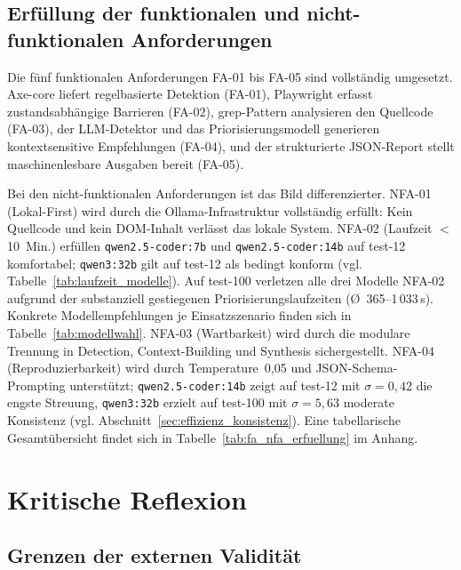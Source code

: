 \subsection{Erfüllung der funktionalen und nicht-funktionalen Anforderungen}
\label{sec:fazit_anforderungen}

Die fünf funktionalen Anforderungen \ac{FA}-01 bis \ac{FA}-05 sind vollständig umgesetzt. Axe-core liefert regelbasierte Detektion (\ac{FA}-01), Playwright erfasst zustandsabhängige Barrieren (\ac{FA}-02), grep-Pattern analysieren den Quellcode (\ac{FA}-03), der \ac{LLM}-Detektor und das Priorisierungsmodell generieren kontextsensitive Empfehlungen (\ac{FA}-04), und der strukturierte \acs{JSON}-Report stellt maschinenlesbare Ausgaben bereit (\ac{FA}-05).

Bei den nicht-funktionalen Anforderungen ist das Bild differenzierter. \ac{NFA}-01 (Lokal-First) wird durch die Ollama-Infrastruktur vollständig erfüllt: Kein Quellcode und kein \ac{DOM}-Inhalt verlässt das lokale System. \ac{NFA}-02 (Laufzeit $<$ 10~Min.) erfüllen \texttt{qwen2.5-coder:7b} und \texttt{qwen2.5-coder:14b} auf test-12 komfortabel; \texttt{qwen3:32b} gilt auf test-12 als bedingt konform (vgl. Tabelle~\ref{tab:laufzeit_modelle}). Auf test-100 verletzen alle drei Modelle \ac{NFA}-02 aufgrund der substanziell gestiegenen Priorisierungslaufzeiten (Ø~365--1\,033\,s). Konkrete Modellempfehlungen je Einsatzszenario finden sich in Tabelle~\ref{tab:modellwahl}. \ac{NFA}-03 (Wartbarkeit) wird durch die modulare Trennung in Detection, Context-Building und Synthesis sichergestellt. \ac{NFA}-04 (Reproduzierbarkeit) wird durch Temperature~0,05 und \acs{JSON}-Schema-Prompting unterstützt; \texttt{qwen2.5-coder:14b} zeigt auf test-12 mit $\sigma = 0{,}42$ die engste Streuung, \texttt{qwen3:32b} erzielt auf test-100 mit $\sigma = 5{,}63$ moderate Konsistenz (vgl. Abschnitt~\ref{sec:effizienz_konsistenz}). Eine tabellarische Gesamtübersicht findet sich in Tabelle~\ref{tab:fa_nfa_erfuellung} im Anhang.

\section{Kritische Reflexion}
\label{sec:fazit_reflexion}

\subsection{Grenzen der externen Validität}
\label{sec:fazit_extern}

